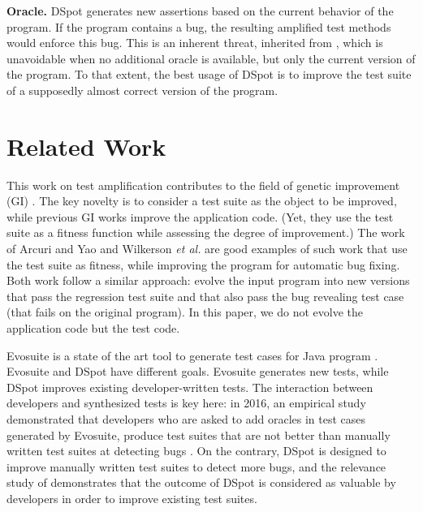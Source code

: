 \documentclass[table,xcdraw,smallextended]{svjour3}
\newcommand{\etal}{\textit{et al.}\xspace}
\newcommand{\dspot}{DSpot\xspace}
\begin{document}
\textbf{Oracle.}
\dspot generates new assertions based on the current behavior of the program. If the program contains a bug, the resulting amplified test methods would enforce this bug. This is an inherent threat, inherited from \cite{Xie2006}, which is unavoidable when no additional oracle is available, but only the current version of the program. 
To that extent, the best usage of \dspot is to improve the test suite of a supposedly almost correct version of the program.



\section{Related Work}
\label{sec:related}

This work on test amplification  contributes to the field of genetic improvement (GI)  \cite{petke2017genetic}. 
The key novelty is to consider a test suite as the object to be improved, while previous GI works improve the application code.
(Yet, they use the test suite as a fitness function while  assessing the degree of improvement.) The work of Arcuri and Yao \cite{arcuri2008novel} and Wilkerson \etal \cite{wilkerson2010coevolutionary} are good examples of such work that use the test suite as fitness, while improving the program for automatic bug fixing. Both work follow a similar approach: evolve the input program into new versions that pass the regression test suite and that also pass the bug revealing test case (that fails on the original program). In this paper, we do not evolve the application code but the test code.

Evosuite is a state of the art tool to generate test cases for Java program \cite{fraser2013whole}. Evosuite and \dspot have different goals. Evosuite generates new tests, while \dspot improves existing developer-written tests. The interaction between developers and synthesized tests is key here: in 2016, an empirical study demonstrated that developers who are asked to add oracles in test cases generated by Evosuite, produce test suites that are not better than manually written test suites at detecting bugs \cite{fraser2015does}. On the contrary, \dspot is designed to improve manually written test suites to detect more bugs, and  the relevance study of \rqpullrequest demonstrates that the outcome of \dspot is considered as valuable by developers in order to improve existing test suites. 
\end{document}
